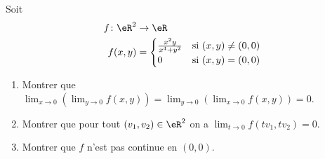 \begin{exercice}[\minsyndical]\label{exoLimiteContinue0008}

Soit 
\begin{equation}
	\begin{aligned}
		f\colon \eR^2&\to \eR \\
		f(x,y)&=
		\begin{cases}
			\frac{x^2 y }{x^4 + y^2} 	&	\text{si }(x,y)\neq (0,0)\\
			0	&	 \text{si }(x,y)=(0,0)
		\end{cases}
	\end{aligned}
\end{equation}
\begin{enumerate}
	\item
Montrer que  $\lim_{x\to 0} (\lim_{y \to 0} f(x,y)) = \lim_{y\to 0} (\lim_{x \to 0} f(x,y)) = 0$.
\item
Montrer que pour tout $ (v_1, v_2 ) \in \eR^2$ on a 
$ \lim_{t\to 0 } f(tv_1, tv_2) = 0$.
\item
 Montrer que $f$ n'est pas continue en $(0,0)$.

		
\end{enumerate}

\end{exercice}
